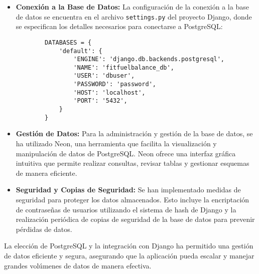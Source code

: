 \begin{itemize}
    \item \textbf{Conexión a la Base de Datos:} La configuración de la conexión a la base de datos se encuentra en el archivo \texttt{settings.py} del proyecto Django, donde se especifican los detalles necesarios para conectarse a PostgreSQL:
    \begin{verbatim}
        DATABASES = {
            'default': {
                'ENGINE': 'django.db.backends.postgresql',
                'NAME': 'fitfuelbalance_db',
                'USER': 'dbuser',
                'PASSWORD': 'password',
                'HOST': 'localhost',
                'PORT': '5432',
            }
        }
    \end{verbatim}

    \item \textbf{Gestión de Datos:} Para la administración y gestión de la base de datos, se ha utilizado Neon, una herramienta que facilita la visualización y manipulación de datos de PostgreSQL. Neon ofrece una interfaz gráfica intuitiva que permite realizar consultas, revisar tablas y gestionar esquemas de manera eficiente.

    \item \textbf{Seguridad y Copias de Seguridad:} Se han implementado medidas de seguridad para proteger los datos almacenados. Esto incluye la encriptación de contraseñas de usuarios utilizando el sistema de hash de Django y la realización periódica de copias de seguridad de la base de datos para prevenir pérdidas de datos.

\end{itemize}

La elección de PostgreSQL y la integración con Django ha permitido una gestión de datos eficiente y segura, asegurando que la aplicación pueda escalar y manejar grandes volúmenes de datos de manera efectiva.